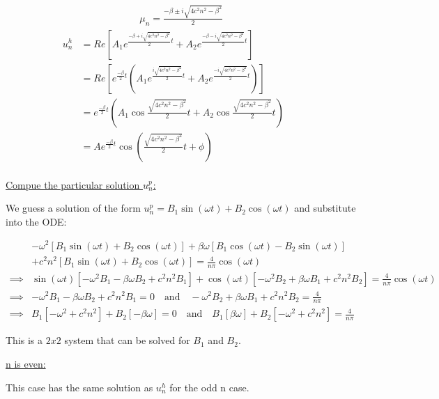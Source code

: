 \documentclass{article}
\begin{document}
\begin{align*}
  \mu_{n} = \frac{-\beta \pm i \sqrt{4 c^2 n^2 - \beta^2}}{2}
\end{align*}
\begin{align*}
  u_n^h &= Re \left[A_1 e^{\frac{-\beta + i \sqrt{4 c^2 n^2 - \beta^2}}{2} t}
  +
  A_2 e^{\frac{-\beta - i \sqrt{4 c^2 n^2 - \beta^2}}{2} t}
  \right] &&\\
  &= Re \left[e^{\frac{-\beta}{2} t}
  \left(A_1 e^{\frac{i \sqrt{4 c^2 n^2 - \beta^2}}{2} t}
  +
  A_2 e^{\frac{-i \sqrt{4 c^2 n^2 - \beta^2}}{2} t} \right)
  \right] &&\\
  &= e^{\frac{-\beta}{2} t}
  \left(A_1 \cos{\frac{\sqrt{4 c^2 n^2 - \beta^2}}{2} t}
  +
  A_2 \cos{\frac{\sqrt{4 c^2 n^2 - \beta^2}}{2} t} \right) &&\\
  &= A e^{\frac{-\beta}{2} t}
  \cos({\frac{\sqrt{4 c^2 n^2 - \beta^2}}{2} t + \phi}) &&\\
\end{align*}

\underline{Compue the particular solution $u_n^p$:}
\newline

We guess a solution of the form $u_n^p = B_1 \sin(\omega t) + B_2 \cos(\omega t)$ and substitute into the ODE:

\begin{align*}
  &-\omega^2 [B_1 \sin(\omega t) +  B_2 \cos(\omega t)]
  + \beta \omega [B_1 \cos(\omega t) - B_2 \sin(\omega t)] \\
  & + c^2n^2 [B_1 \sin(\omega t) + B_2 \cos(\omega t)]
  =
  \frac{4}{n \pi} \cos(\omega t) \\
  \implies&\sin(\omega t)
  [-\omega^2 B_1 - \beta \omega B_2 + c^2 n^2 B_1] 
  +
  \cos(\omega t)
  [-\omega^2 B_2 + \beta \omega B_1 + c^2 n^2 B_2]
  = \frac{4}{n \pi} \cos(\omega t) \\
  \implies& -\omega^2 B_1 - \beta \omega B_2 + c^2 n^2 B_1 = 0 
  \quad \text{and} \quad
  -\omega^2 B_2 + \beta \omega B_1 + c^2 n^2 B_2 = \frac{4}{n \pi} \\
  \implies& B_1 [-\omega^2 + c^2 n^2] + B_2 [-\beta \omega] = 0 
  \quad \text{and} \quad
  B_1 [\beta \omega] + B_2 [-\omega^2 + c^2 n^2]
  = \frac{4}{n \pi}
\end{align*}

This is a $2x2$ system that can be solved for $B_1$ and $B_2$.
\newline

\underline{n is even:}

This case has the same solution as $u_n^h$ for the odd n case.
\newline
\end{document}
